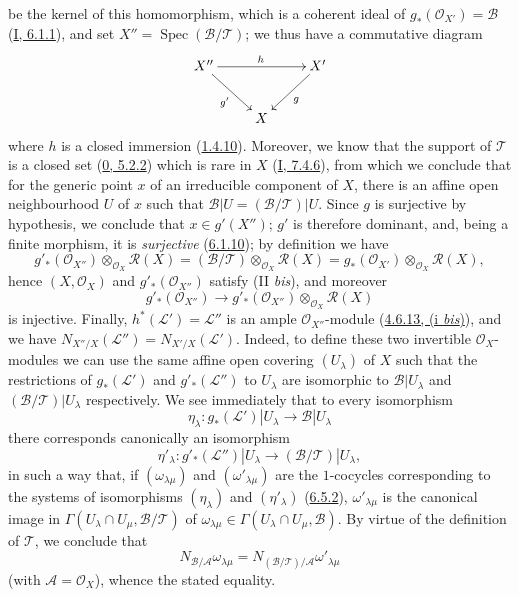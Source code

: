 be the kernel of this homomorphism, which is a coherent ideal of
$g_*(\mathcal{O}_{X'})=\mathcal{B}$
(\hyperref[I.6.1.1]{I, 6.1.1}), and set
$X''=\operatorname{Spec}(\mathcal{B}/\mathcal{T})$; we thus have a
commutative diagram
\[
\xymatrix{
X''\ar[rr]^h\ar[dr]_{g'} && X'\ar[dl]^g\\
& X
}
\]
where $h$ is a closed immersion (\hyperref[II.1.4.10]{1.4.10}). Moreover,
we know that the support of $\mathcal{T}$ is a closed set
(\hyperref[0.5.2.2]{0, 5.2.2}) which is rare in $X$
(\hyperref[I.7.4.6]{I, 7.4.6}), from which we conclude that for the generic
point $x$ of an irreducible component of $X$, there is an affine open
neighbourhood $U$ of $x$ such that
$\mathcal{B}|U=(\mathcal{B}/\mathcal{T})|U$. Since $g$ is surjective by
hypothesis, we conclude that $x\in g'(X'')$; $g'$ is therefore dominant, and,
being a finite morphism, it is \emph{surjective}
(\hyperref[II.6.1.10]{6.1.10}); by definition we have
\[
g'_*(\mathcal{O}_{X''})\otimes_{\mathcal{O}_X}\mathcal{R}(X)
=(\mathcal{B}/\mathcal{T})\otimes_{\mathcal{O}_X}\mathcal{R}(X)
=g_*(\mathcal{O}_{X'})\otimes_{\mathcal{O}_X}\mathcal{R}(X),
\]
hence $(X,\mathcal{O}_X)$ and $g'_*(\mathcal{O}_{X''})$ satisfy
(II \emph{bis}), and moreover
\[
g'_*(\mathcal{O}_{X''})\longrightarrow
g'_*(\mathcal{O}_{X''})\otimes_{\mathcal{O}_X}\mathcal{R}(X)
\]
is injective. Finally, $h^*(\mathcal{L}')=\mathcal{L}''$ is an ample
$\mathcal{O}_{X''}$-module
(\hyperref[II.4.6.13]{4.6.13, (i \emph{bis})}), and we have
$N_{X''/X}(\mathcal{L}'')=N_{X'/X}(\mathcal{L}')$. Indeed, to define
these two invertible $\mathcal{O}_X$-modules we can use the same
affine open covering $(U_\lambda)$ of $X$ such that the restrictions of
$g_*(\mathcal{L}')$ and $g'_*(\mathcal{L}'')$ to $U_\lambda$ are
isomorphic to $\mathcal{B}|U_\lambda$ and
$(\mathcal{B}/\mathcal{T})|U_\lambda$ respectively. We see immediately that to
every isomorphism
\[
\eta_\lambda:g_*(\mathcal{L}')|U_\lambda\longrightarrow
\mathcal{B}|U_\lambda
\]
there corresponds canonically an isomorphism
\[
\eta'_\lambda:g'_*(\mathcal{L}'')|U_\lambda\longrightarrow
(\mathcal{B}/\mathcal{T})|U_\lambda,
\]
in such a way that, if $(\omega_{\lambda\mu})$ and
$(\omega'_{\lambda\mu})$ are the $1$-cocycles corresponding to the systems
of isomorphisms $(\eta_\lambda)$ and $(\eta'_\lambda)$
(\hyperref[II.6.5.2]{6.5.2}), $\omega'_{\lambda\mu}$ is the canonical
image in
$\Gamma(U_\lambda\cap U_\mu,\mathcal{B}/\mathcal{T})$ of
$\omega_{\lambda\mu}\in\Gamma(U_\lambda\cap U_\mu,\mathcal{B})$. By virtue
of the definition of $\mathcal{T}$, we conclude that
\[
N_{\mathcal{B}/\mathcal{A}}\omega_{\lambda\mu}
=N_{(\mathcal{B}/\mathcal{T})/\mathcal{A}}\omega'_{\lambda\mu}
\]
(with $\mathcal{A}=\mathcal{O}_X$), whence the stated equality.

